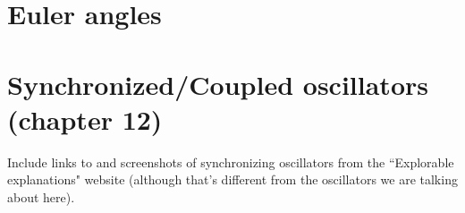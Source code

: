 \documentclass{article}
\begin{document}
\section{Euler angles}

\section{Synchronized/Coupled oscillators (chapter 12)}
Include links to and screenshots of synchronizing oscillators from the ``Explorable explanations" website (although that's different from the oscillators we are talking about here).
\end{document}
